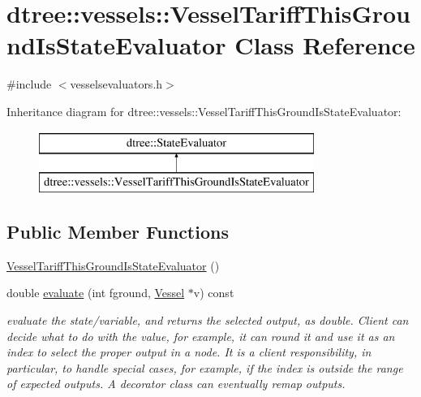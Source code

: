 \hypertarget{classdtree_1_1vessels_1_1_vessel_tariff_this_ground_is_state_evaluator}{}\section{dtree\+::vessels\+::Vessel\+Tariff\+This\+Ground\+Is\+State\+Evaluator Class Reference}
\label{classdtree_1_1vessels_1_1_vessel_tariff_this_ground_is_state_evaluator}


{\ttfamily \#include $<$vesselsevaluators.\+h$>$}

Inheritance diagram for dtree\+::vessels\+::Vessel\+Tariff\+This\+Ground\+Is\+State\+Evaluator\+:\begin{figure}[H]
\begin{center}
\leavevmode
\includegraphics[height=2.000000cm]{d0/d90/classdtree_1_1vessels_1_1_vessel_tariff_this_ground_is_state_evaluator}
\end{center}
\end{figure}
\subsection*{Public Member Functions}
\begin{DoxyCompactItemize}
\item 
\mbox{\hyperlink{classdtree_1_1vessels_1_1_vessel_tariff_this_ground_is_state_evaluator_a81ddee7b3141b8787551f6bffddb5bb7}{Vessel\+Tariff\+This\+Ground\+Is\+State\+Evaluator}} ()
\item 
double \mbox{\hyperlink{classdtree_1_1vessels_1_1_vessel_tariff_this_ground_is_state_evaluator_afd65c12067b4bfd61b1554a97e77268e}{evaluate}} (int fground, \mbox{\hyperlink{class_vessel}{Vessel}} $\ast$v) const
\begin{DoxyCompactList}\small\item\em evaluate the state/variable, and returns the selected output, as double. Client can decide what to do with the value, for example, it can round it and use it as an index to select the proper output in a node. It is a client responsibility, in particular, to handle special cases, for example, if the index is outside the range of expected outputs. A decorator class can eventually remap outputs. \end{DoxyCompactList}\end{DoxyCompactItemize}


